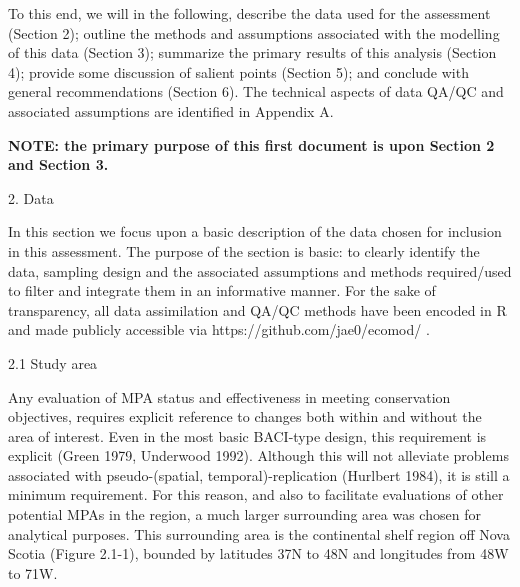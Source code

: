 \documentclass[letterpaper,portrait,12pt]{scrartcl}
\numberwithin{equation}{section}		%
\numberwithin{figure}{section}			%
\numberwithin{table}{section}				%
\begin{document}
To this end, we will in the following, describe the data used for the assessment (Section 2); outline the methods and assumptions associated with the modelling of this data (Section 3); summarize the primary results of this analysis (Section 4); provide some discussion of salient points (Section 5); and conclude with general recommendations (Section 6). The technical aspects of data QA/QC and associated assumptions are identified in Appendix A.









\textbf{NOTE: the primary purpose of this first document is upon Section 2 and Section 3. }














2. Data 









In this section we focus upon a basic description of the data chosen for inclusion in this assessment. The purpose of the section is basic: to clearly identify the data, sampling design and the associated assumptions and methods required/used to filter and integrate them in an informative manner. For the sake of transparency, all data assimilation and QA/QC methods have been encoded in R and made publicly accessible via https://github.com/jae0/ecomod/ . 














2.1 Study area









Any evaluation of MPA status and effectiveness in meeting conservation objectives, requires explicit reference to changes both within and without the area of interest. Even in the most basic BACI-type design, this requirement is explicit (Green 1979, Underwood 1992). Although this will not alleviate problems associated with pseudo-(spatial, temporal)-replication (Hurlbert 1984), it is still a minimum requirement. For this reason, and also to facilitate evaluations of other potential MPAs in the region, a much larger surrounding area was chosen for analytical purposes. This surrounding area is the continental shelf region off Nova Scotia (Figure 2.1-1), bounded by latitudes 37N to 48N and longitudes from 48W to 71W.  
\end{document}
